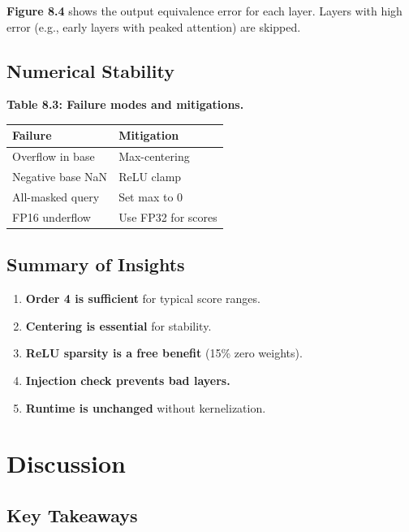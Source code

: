 \textbf{Figure 8.4} shows the output equivalence error for each layer. Layers 
with high error (e.g., early layers with peaked attention) are skipped.

\subsection{Numerical Stability}

\textbf{Table 8.3: Failure modes and mitigations.}

\begin{table}[H]
\centering
\small
\begin{tabular}{ll}
\toprule
\textbf{Failure} & \textbf{Mitigation} \\
\midrule
Overflow in base & Max-centering \\
Negative base NaN & ReLU clamp \\
All-masked query & Set max to 0 \\
FP16 underflow & Use FP32 for scores \\
\bottomrule
\end{tabular}
\end{table}

\subsection{Summary of Insights}

\begin{enumerate}
\item \textbf{Order 4 is sufficient} for typical score ranges.
\item \textbf{Centering is essential} for stability.
\item \textbf{ReLU sparsity is a free benefit} (15\% zero weights).
\item \textbf{Injection check prevents bad layers.}
\item \textbf{Runtime is unchanged} without kernelization.

\end{enumerate}


\section{Discussion}

\subsection{Key Takeaways}

